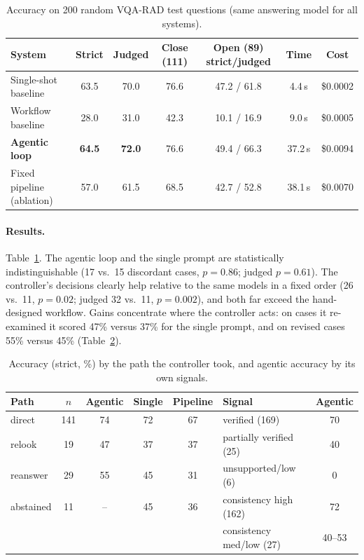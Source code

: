 \begin{table}[t]
  \centering
  \caption{Accuracy on 200 random VQA-RAD test questions (same answering model for all systems).}
  \label{tab:main}
  \small
  \begin{tabular}{lcccccc}
    \toprule
    System & Strict & Judged & Close (111) & Open (89) strict/judged & Time & Cost \\
    \midrule
    Single-shot baseline      & 63.5 & 70.0 & 76.6 & 47.2 / 61.8 & 4.4\,s  & \$0.0002 \\
    Workflow baseline         & 28.0 & 31.0 & 42.3 & 10.1 / 16.9 & 9.0\,s  & \$0.0005 \\
    \textbf{Agentic loop}     & \textbf{64.5} & \textbf{72.0} & 76.6 & 49.4 / 66.3 & 37.2\,s & \$0.0094 \\
    Fixed pipeline (ablation) & 57.0 & 61.5 & 68.5 & 42.7 / 52.8 & 38.1\,s & \$0.0070 \\
    \bottomrule
  \end{tabular}
\end{table}

\paragraph{Results.} Table~\ref{tab:main}. The agentic loop and the single prompt are statistically
indistinguishable (17 vs.\ 15 discordant cases, $p=0.86$; judged $p=0.61$). The controller's decisions clearly help
relative to the same models in a fixed order (26 vs.\ 11, $p=0.02$; judged 32 vs.\ 11, $p=0.002$), and both far
exceed the hand-designed workflow. Gains concentrate where the controller acts: on cases it re-examined it scored
47\% versus 37\% for the single prompt, and on revised cases 55\% versus 45\% (Table~\ref{tab:paths}).

\begin{table}[t]
  \centering
  \caption{Accuracy (strict, \%) by the path the controller took, and agentic accuracy by its own signals.}
  \label{tab:paths}
  \small
  \begin{tabular}{lcccc@{\hskip 18pt}lc}
    \toprule
    Path & $n$ & Agentic & Single & Pipeline & Signal & Agentic \\
    \midrule
    direct    & 141 & 74 & 72 & 67 & verified (169)            & 70 \\
    relook    & 19  & 47 & 37 & 37 & partially verified (25)   & 40 \\
    reanswer  & 29  & 55 & 45 & 31 & unsupported/low (6)       & 0  \\
    abstained & 11  & -- & 45 & 36 & consistency high (162)    & 72 \\
              &     &    &    &    & consistency med/low (27)  & 40--53 \\
    \bottomrule
  \end{tabular}
\end{table}

